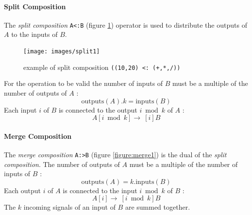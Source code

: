 \documentclass[a4paper,10pt]{book}
\begin{document}
\paragraph{Split Composition}
The \emph{split composition}  \lstinline$A<:B$ (figure \ref{figure:split1}) operator is used to distribute the outputs
of $A$ to the inputs of $B$.

\begin{figure}[h]
\centering 
\texttt{[image: images/split1]} 
\caption{example of split composition   \lstinline'((10,20) <: (+,*,/))'}  
\label{figure:split1}
\end{figure}

For the operation to be valid the number of inputs of $B$ must be a multiple of the number of outputs of $A$ : \begin{equation}
\mathrm{outputs}(A).k=\mathrm{inputs}(B)                                                                                                                                                         \end{equation}
Each input $i$ of $B$ is connected to the output $i \bmod k$ of $A$ : 
\begin{equation}
A[i \bmod k]\rightarrow\ [i]B                                                                                                                                                                                                                                                                                                                       \end{equation}


\paragraph{Merge Composition}
The \emph{merge composition}  \lstinline$A:>B$ (figure \ref{figure:merge1}) is the dual of the \emph{split composition}. The number of outputs of $A$ must be a multiple of the number of inputs of $B$ : 
\begin{equation}
\mathrm{outputs}(A)=k.\mathrm{inputs}(B)                                                                                                                                                                                                                                                  \end{equation}
Each output $i$ of $A$ is connected to the input $i \bmod k$ of $B$ : 
\begin{equation}
A[i]\rightarrow\ [i \bmod k]B                                                                                                   \end{equation} 
The $k$ incoming signals of an input of $B$ are summed together.
\end{document}
